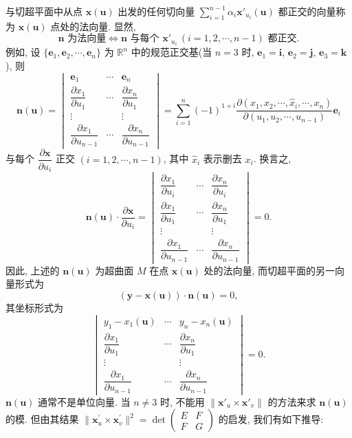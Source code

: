 \begin{example}
与切超平面中从点 $\boldsymbol{x}(\boldsymbol{u})$ 出发的任何切向量 $\sum_{i=1}^{n-1}\alpha_i \boldsymbol{x}'_{u_i}(\boldsymbol{u})$ 都正交的向量称为 $\boldsymbol{x}(\boldsymbol{u})$ 点处的法向量. 显然,
\[
  \boldsymbol{n} \text{ 为法向量} \iff \boldsymbol{n} \text{ 与每个 } \boldsymbol{x}'_{u_i}\,(i = 1, 2, \cdots, n - 1) \text{ 都正交}.
\]
例如, 设 $\{\boldsymbol{e}_{1}, \boldsymbol{e}_{2}, \cdots, \boldsymbol{e}_{n}\}$ 为 $\mathbb{R}^{n}$ 中的规范正交基(当 $n = 3$ 时, $\boldsymbol{e}_{1} = \boldsymbol{i}$, $\boldsymbol{e}_{2} = \boldsymbol{j}$, $\boldsymbol{e}_{3} = \boldsymbol{k}$), 则
\[
  \boldsymbol{n}(\boldsymbol{u}) = \begin{vmatrix}
    \boldsymbol{e}_{1} & \cdots & \boldsymbol{e}_{n} \\
    \dfrac{\partial x_{1}}{\partial u_{1}} & \cdots & \dfrac{\partial x_{n}}{\partial u_{1}} \\
    \vdots & & \vdots \\
    \dfrac{\partial x_{1}}{\partial u_{n-1}} & \cdots & \dfrac{\partial x_{n}}{\partial u_{n-1}}
  \end{vmatrix} = \sum_{i=1}^{n}(-1)^{1+i}\frac{\partial(x_{1}, x_{2}, \cdots, \hat{x}_{i}, \cdots, x_{n})}{\partial(u_{1}, u_{2}, \cdots, u_{n-1})}\boldsymbol{e}_{i}
\]
与每个 $\dfrac{\partial\boldsymbol{x}}{\partial u_{i}}$ 正交 $(i = 1, 2, \cdots, n - 1)$, 其中 $\hat{x}_{i}$ 表示删去 $x_{i}$. 换言之,
\[
  \boldsymbol{n}(\boldsymbol{u}) \cdot \frac{\partial\boldsymbol{x}}{\partial u_{i}} = \begin{vmatrix}
    \dfrac{\partial x_{1}}{\partial u_{i}} & \cdots & \dfrac{\partial x_{n}}{\partial u_{i}} \\
    \dfrac{\partial x_{1}}{\partial u_{1}} & \cdots & \dfrac{\partial x_{n}}{\partial u_{1}} \\
    \vdots & & \vdots \\
    \dfrac{\partial x_{1}}{\partial u_{n-1}} & \cdots & \dfrac{\partial x_{n}}{\partial u_{n-1}}
  \end{vmatrix} = 0.
\]
因此, 上述的 $\boldsymbol{n}(\boldsymbol{u})$ 为超曲面 $M$ 在点 $\boldsymbol{x}(\boldsymbol{u})$ 处的法向量, 而切超平面的另一向量形式为
\[
  (\boldsymbol{y} - \boldsymbol{x}(\boldsymbol{u})) \cdot \boldsymbol{n}(\boldsymbol{u}) = 0,
\]
其坐标形式为
\[
  \begin{vmatrix}
    y_{1} - x_{1}(\boldsymbol{u}) & \cdots & y_{n} - x_{n}(\boldsymbol{u}) \\
    \dfrac{\partial x_{1}}{\partial u_{1}} & \cdots & \dfrac{\partial x_{n}}{\partial u_{1}} \\
    \vdots & & \vdots \\
    \dfrac{\partial x_{1}}{\partial u_{n-1}} & \cdots & \dfrac{\partial x_{n}}{\partial u_{n-1}}
  \end{vmatrix} = 0.
\]
$\boldsymbol{n}(\boldsymbol{u})$ 通常不是单位向量. 当 $n \neq 3$ 时, 不能用 $\|\boldsymbol{x}'_{u} \times \boldsymbol{x}'_{v}\|$ 的方法来求 $\boldsymbol{n}(\boldsymbol{u})$ 的模. 但由其结果 $\|\boldsymbol{x}_{u}^{\prime} \times \boldsymbol{x}_{v}^{\prime}\|^{2} = \det\begin{pmatrix} E & F \\ F & G \end{pmatrix}$ 的启发, 我们有如下推导:


\end{example}
